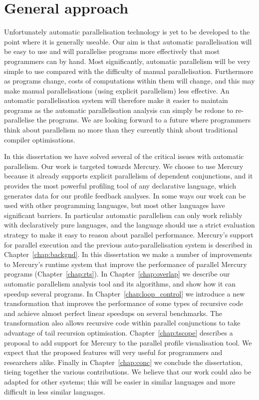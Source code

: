 

\section{General approach}
\label{sec:intro_general_approach}

Unfortunately automatic parallelisation technology is yet to be developed to the
point where it is generally useable.
Our aim is that automatic parallelisation will be easy to use and
will parallelise programs more effectively that most programmers can by
hand.
Most significantly,
automatic parallelism will be very simple to use compared with the
difficulty of manual parallelisation.
Furthermore as programs change,
costs of computations within them will change,
and this may make manual parallelisations (using explicit parallelism) less
effective.
An automatic parallelisation system will therefore make it easier to
maintain programs as the automatic parallelisation analysis can simply be
redone to re-parallelise the programs.
We are looking forward to a future where programmers think about
parallelism no more than they currently think about traditional compiler
optimisations.

In this dissertation we have solved several of the critical issues with
automatic parallelism.
Our work is targeted towards Mercury.
We choose to use Mercury because
it already supports explicit parallelism of dependent conjunctions,
and it provides the most powerful profiling tool of any declarative language,
which generates data for our profile feedback analyses.
In some ways our work can be used with other programming languages,
but most other languages have significant barriers.
In particular automatic parallelism can only work reliably with declaratively
pure languages,
and the language should use a strict evaluation strategy to make it easy to
reason about parallel performance.
Mercury's support for parallel execution and the previous
auto-parallelisation system \citep{bone:2008:hons} is described in
Chapter~\ref{chap:backgnd}.
In this dissertation we make a number of improvements to Mercury's runtime
system that improve the performance of parallel Mercury programs
(Chapter~\ref{chap:rts}).
In Chapter~\ref{chap:overlap} we describe our
automatic parallelism analysis tool and its algorithms,
and show how it can speedup several programs.
In Chapter~\ref{chap:loop_control} we introduce a new transformation that
improves the performance of 
some types of recursive code and achieve almost perfect linear speedups on
several benchmarks.
The transformation also allows recursive code within parallel conjunctions
to take advantage of tail recursion optimisation.
Chapter~\ref{chap:tscope} describes a proposal to add support for Mercury to
the \tscope parallel profile visualisation tool.
We expect that the proposed features will very useful for programmers and
researchers alike.
Finally in Chapter~\ref{chap:conc} we conclude the dissertation,
tieing together the various contributions.
We believe that our work could also be adapted for other systems;
this will be easier in similar languages and more difficult in less similar
languages.

